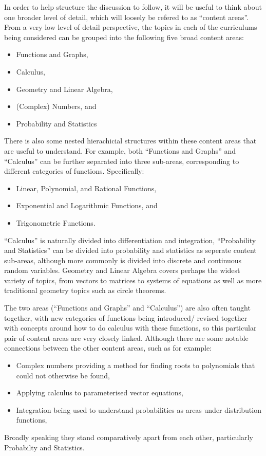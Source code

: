 \documentclass[twoside,12pt,a4paper]{report}
\begin{document}
In order to help structure the discussion to follow, it will be useful to think about one broader level of detail, which will loosely be refered to as ``content areas''. From a very low level of detail perspective, the topics in each of the curriculums being considered can be grouped into the following five broad content areas:
\begin{itemize}
	\item Functions and Graphs, 
	\item Calculus, 
	\item Geometry and Linear Algebra, 
	\item (Complex) Numbers, and 
	\item Probability and Statistics	
\end{itemize}
There is also some nested hierachicial structures within these content areas that are useful to understand. For example, both ``Functions and Graphs'' and ``Calculus'' can be further separated into three sub-areas, corresponding to different categories of functions. Specifically: 
\begin{itemize}
	\item Linear, Polynomial, and Rational Functions,
	\item Exponential and Logarithmic Functions, and
	\item Trigonometric Functions.
\end{itemize} 
``Calculus'' is naturally divided into differentiation and integration, ``Probability and Statistics'' can be divided into probability and statistics as seperate content sub-areas, although more commonly is divided into discrete and continuous random variables. Geometry and Linear Algebra covers perhaps the widest variety of topics, from vectors to matrices to systems of equations as well as more traditional geometry topics such as circle theorems. 

The two areas (``Functions and Graphs'' and ``Calculus'') are also often taught together, with new categories of functions being introduced/ revised together with concepts around how to do calculus with these functions, so this particular pair of content areas are very closely linked. Although there are some notable connections between the other content areas, such as for example: 
\begin{itemize}
	\item Complex numbers providing a method for finding roots to polynomials that could not otherwise be found,
	\item Applying calculus to parameterised vector equations, 
	\item Integration being used to understand probabilities as areas under distribution functions,
\end{itemize}
Broadly speaking they stand comparatively apart from each other, particularly Probabilty and Statistics. 
\end{document}
